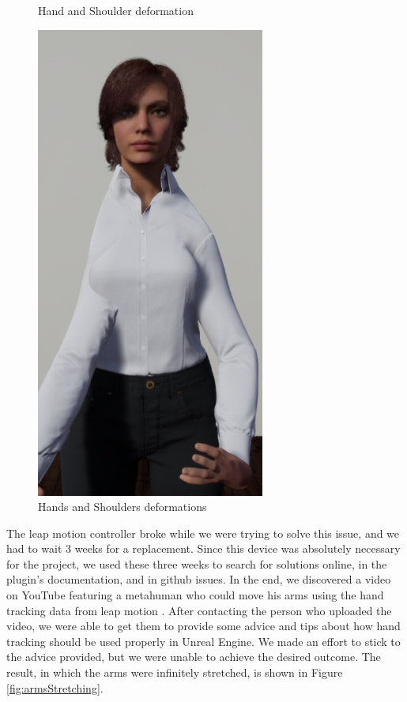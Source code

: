 \begin{table}[!htb]
\begin{minipage}{\linewidth}
\begin{subfigure}{0.49\textwidth}
            \caption{Hand and Shoulder deformation}
        \end{subfigure}
        \begin{subfigure}{0.49\textwidth}
            \includegraphics[width=0.67\textwidth]{figures/FirstInteraction.png}
            \centering
            \caption{Hands and Shoulders deformations}
        \end{subfigure}
        \label{fig:initialSteps}
	\end{minipage}
\end{table}

The leap motion controller broke while we were trying to solve this issue, and we had to wait 3 weeks for a replacement. Since this device was absolutely necessary for the project, we used these three weeks to search for solutions online, in the plugin's documentation, and in github issues. In the end, we discovered a video on YouTube featuring a metahuman who could move his arms using the hand tracking data from leap motion \cite{TVL}. After contacting the person who uploaded the video, we were able to get them to provide some advice and tips about how hand tracking should be used properly in Unreal Engine. We made an effort to stick to the advice provided, but we were unable to achieve the desired outcome. The result, in which the arms were infinitely stretched, is shown in Figure \ref{fig:armsStretching}.

